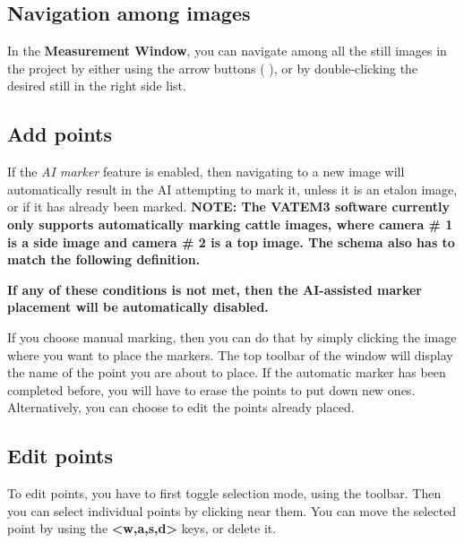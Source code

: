 \documentclass[10pt,a4paper,oneside]{report}             %
\newcommand*{\img}[1]{%
	\raisebox{-.02\baselineskip}{%
		\texttt{[image: \#1]}%
	}%
}
\begin{document}
\subsection{Navigation among images}

In the \textbf{Measurement Window}, you can navigate among all the still images in the project by either using the arrow buttons (\img{../VAM/Icons/1462036195_arrow-left1.png} \img{../VAM/Icons/1462036198_arrow-right1.png}), or by double-clicking the desired still in the right side list.


\subsection{Add points}

If the \textit{AI marker} feature is enabled, then navigating to a new image will automatically result in the AI attempting to mark it, unless it is an etalon image, or if it has already been marked. \textbf{NOTE: The VATEM3 software currently only supports automatically marking cattle images, where camera \# 1 is  a side image and camera \# 2 is a top image. The schema also has to match the following definition.}

\textbf{If any of these conditions is not met, then the AI-assisted marker placement will be automatically disabled.}

If you choose manual marking, then you can do that by simply clicking the image where you want to place the markers. The top toolbar of the window will display the name of the point you are about to place. If the automatic marker has been completed before, you will have to erase the points to put down new ones. Alternatively, you can choose to edit the points already placed.

\subsection{Edit points}

To edit points, you have to first toggle selection mode, using the toolbar. Then you can select individual points by clicking near them. You can move the selected point by using the \textbf{<w,a,s,d>} keys, or delete it.
\end{document}
